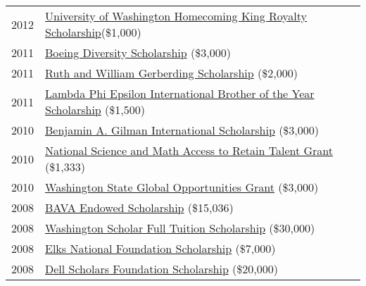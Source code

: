 \documentclass[11pt]{article}
\begin{document}
{{\begin{longtable}{Rp{0.75in}p{5.0in}}
\footnotesize{2012} & \href{https://www.washington.edu/uaa/2013/06/28/oh-the-places-theyll-go-new-grads-and-their-plans/bryan-dosono/}{University of Washington Homecoming King Royalty Scholarship}(\$1,000)\\

\footnotesize{2011} & \href{https://ischool.uw.edu/news/2016/12/bryan-dosono-informatics-student-speaks-boeing-scholarship-breakfast}{Boeing Diversity Scholarship} (\$3,000)\\

\footnotesize{2011} & \href{https://www.washington.edu/omad/2011/05/17/assunta-ng-student-scholars-honored-at-41st-annual-eop-celebration/}{Ruth and William Gerberding Scholarship} (\$2,000)\\

\footnotesize{2011} & \href{http://lambdaphiepsilon.com/resources/\#academicachievement}{Lambda Phi Epsilon International Brother of the Year Scholarship} (\$1,500)\\

\footnotesize{2010} & \href{https://depts.washington.edu/uwhonors/news/brief/?id=61}{Benjamin A. Gilman International Scholarship} (\$3,000)\\

\footnotesize{2010} & \href{https://web.archive.org/web/20210525151411/https://www2.ed.gov/programs/smart/index.html}{National Science and Math Access to Retain Talent Grant} (\$1,333)\\

\footnotesize{2010} & \href{https://www.washington.edu/studyabroad/students/resources/finances/scholarships/}{Washington State Global Opportunities Grant} (\$3,000)\\

\footnotesize{2008} & \href{https://web.archive.org/web/20200328042219/https://www.washington.edu/giving/recognition/rtc-2016/top-ten-lists/}{BAVA Endowed Scholarship} (\$15,036)\\

\footnotesize{2008} & \href{https://www.wsac.wa.gov/}{Washington Scholar Full Tuition Scholarship} (\$30,000)\\

\footnotesize{2008} & \href{https://www.elks.org/enf/scholars/}{Elks National Foundation Scholarship} (\$7,000)\\

\footnotesize{2008} & \href{https://www.dellscholars.org/}{Dell Scholars Foundation Scholarship} (\$20,000)\\


\end{longtable}}}
\end{document}
